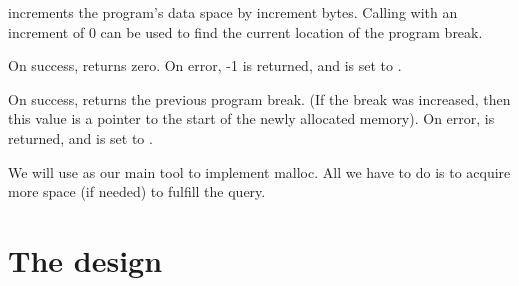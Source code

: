  increments the program's data space by increment bytes. Calling  with an increment of 0 can be used to find the current location of the program break.

On success,  returns zero. On error, -1 is returned, and  is set to .

On success,  returns the previous program break. (If the break was increased, then this value is a pointer to the start of the newly allocated memory). On error,  is returned, and  is set to . 

We will use  as our main tool to implement malloc. All we have to do is to acquire more space (if needed) to fulfill the query.

\section{The design}